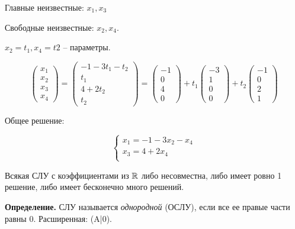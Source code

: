 Главные неизвестные: $x_1, x_3$

Свободные неизвестные: $x_2, x_4$.

$x_2 = t_1, x_4 = t2$ -- параметры.

\begin{equation*}
	\begin{pmatrix}
    x_1 \\
    x_2 \\
    x_3 \\
    x_4
	\end{pmatrix}
    =
    \begin{pmatrix}
    -1 - 3t_1 - t_2 \\
    t_1 \\
    4 + 2t_2 \\
    t_2
    \end{pmatrix}
    =
    \begin{pmatrix}
    -1\\
    0\\
    4\\
    0
    \end{pmatrix}
    + t_1
    \begin{pmatrix}
    -3\\
    1\\
    0\\
    0
    \end{pmatrix}
    +t_2
    \begin{pmatrix}
    -1\\
    0\\
    2\\
    1
    \end{pmatrix}
\end{equation*}

Общее решение:

\begin{equation*}
	\left\{
		\begin{aligned}
        x_1 = -1 - 3x_2 - x_4\\
        x_3 = 4 + 2x_4 \\
		\end{aligned}
	\right.
\end{equation*}

\begin{corollary}
Всякая СЛУ с коэффициентами из $\mathbb{R}$ либо несовместна, либо имеет ровно 1 решение, либо имеет бесконечно много решений.
\end{corollary}

\textbf{Определение.} СЛУ называется \textit{однородной} (ОСЛУ), если все ее правые части равны 0. Расширенная: (A|0). 

